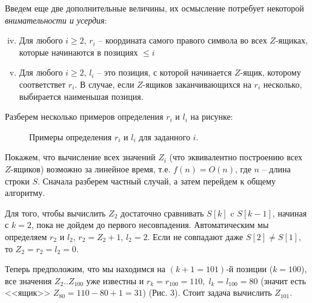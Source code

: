 \documentclass[letterpaper, 11pt]{article}
\begin{document}
\par
Введем еще две дополнительные величины, их осмысление потребует некоторой \textit{внимательности и усердия}:
\begin{enumerate}[(i)]
\setcounter{enumi}{3}
\item
Для любого $i \geq 2$, $r_i$ -- координата самого правого символа во всех $Z$-ящиках, которые начинаются в позициях $\leq i$
\item
Для любого $i \geq 2$, $l_i$ -- это позиция, с которой начинается $Z$-ящик, которому соответствет $r_i$. В случае, если $Z$-ящиков заканчивающихся на $r_i$ несколько, выбирается наименьшая позиция.
\end{enumerate}
\par
Разберем несколько примеров определения $r_i$ и $l_i$ на рисунке:
\begin{figure}[H]
  \caption{Примеры определения $r_i$ и $l_i$ для заданного $i$.}
\end{figure}
\par
Покажем, что вычисление всех значений $Z_i$ (что эквивалентно построению всех $Z$-ящиков) возможно за линейное время, т.е. $f(n) = O(n)$, где $n$ -- длина строки $S$. Сначала разберем частный случай, а затем перейдем к общему алгоритму.
\par
Для того, чтобы вычислить $Z_2$ достаточно сравнивать $S[k]$ c $S[k-1]$, начиная с $k = 2$, пока не дойдем до первого несовпадения. Автоматическим мы определяем $r_2$ и $l_2$, $r_2 = Z_2 + 1$, $l_2 = 2$. Если не совпадают даже $S[2] \neq S[1]$, то $Z_2 = r_2 = l_2 = 0$.
\par
Теперь предположим, что мы находимся на $(k+1 = 101)$-й позиции ($k = 100$), все значения $Z_2 .. Z_{100}$ уже известны и $r_k = r_{100} = 110, \; l_k = l_{100} = 80$ (значит есть <<ящик>> $Z_{80} = 110 - 80 + 1 = 31$) (Рис. 3). Стоит задача вычислить $Z_{101}$.
\end{document}
